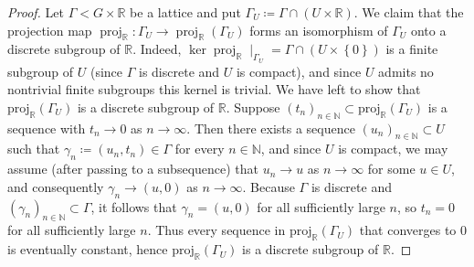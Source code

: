 \documentclass{amsart}
\numberwithin{equation}{subsection}
\theoremstyle{remark}
\begin{document}
\begin{proof}
Let \(\Gamma<G\times\mathbb{R}\) be a lattice and put \(\Gamma_{U}\coloneqq\Gamma\cap\left(U\times\mathbb{R}\right)\). We claim that the projection map \(\operatorname{proj}_{\mathbb{R}}:\Gamma_{U}\to\operatorname{proj}_{\mathbb{R}}\left(\Gamma_{U}\right)\) forms an isomorphism of \(\Gamma_{U}\) onto a discrete subgroup of \(\mathbb{R}\). Indeed, \(\ker\operatorname{proj}_{\mathbb{R}}\mid_{\Gamma_{U}}=\Gamma\cap\left(U\times\left\{ 0\right\} \right)\) is a finite subgroup of \(U\) (since \(\Gamma\) is discrete and \(U\) is compact), and since \(U\) admits no nontrivial finite subgroups this kernel is trivial. We have left to show that \(\mathrm{proj}_{\mathbb{R}}\left(\Gamma_{U}\right)\) is a discrete subgroup of \(\mathbb{R}\). Suppose \(\left(t_{n}\right)_{n\in\mathbb{N}}\subset\mathrm{proj}_{\mathbb{R}}\left(\Gamma_{U}\right)\) is a sequence with \(t_{n}\to0\) as \(n\to\infty\). Then there exists a sequence \(\left(u_{n}\right)_{n\in\mathbb{N}}\subset U\) such that \(\gamma_{n}\coloneqq\left(u_{n},t_{n}\right)\in\Gamma\) for every \(n\in\mathbb{N}\), and since \(U\) is compact, we may assume (after passing to a subsequence) that \(u_{n}\to u\) as \(n\to\infty\) for some \(u\in U\), and consequently \(\gamma_{n}\to\left(u,0\right)\) as \(n\to\infty\). Because \(\Gamma\) is discrete and \(\left(\gamma_{n}\right)_{n\in\mathbb{N}}\subset\Gamma\), it follows that \(\gamma_{n}=\left(u,0\right)\) for all sufficiently large \(n\), so \(t_{n}=0\) for all sufficiently large \(n\). Thus every sequence in \(\mathrm{proj}_{\mathbb{R}}\left(\Gamma_{U}\right)\) that converges to \(0\) is eventually constant, hence \(\mathrm{proj}_{\mathbb{R}}\left(\Gamma_{U}\right)\) is a discrete subgroup of \(\mathbb{R}\).


\end{proof}
\end{document}
